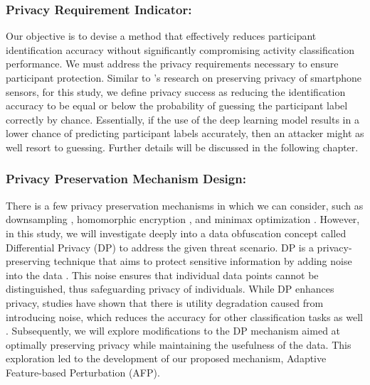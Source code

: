 \documentclass{l4proj}
\begin{document}
\subsubsection{Privacy Requirement Indicator:}
Our objective is to devise a method that effectively reduces participant identification accuracy without significantly compromising activity classification performance. We must address the privacy requirements necessary to ensure participant protection. Similar to \cite{differential_privacy_with_weighted_privacy_preservation}'s research on preserving privacy of smartphone sensors, for this study, we define privacy success as reducing the identification accuracy to be equal or below the probability of guessing the participant label correctly by chance. Essentially, if the use of the deep learning model results in a lower chance of predicting participant labels accurately, then an attacker might as well resort to guessing. Further details will be discussed in the following chapter.

\subsubsection{Privacy Preservation Mechanism Design:}
There is a few privacy preservation mechanisms in which we can consider, such as downsampling \citep{privacy-preservation_using_low_resolution_depth_images, privacy_preserving_for_extreme_low_resolution}, homomorphic encryption \citep{crypto-nets_neural_network_over_encrypted_data}, and minimax optimization \citep{privacy_preserving_adversarial_framework}. However, in this study, we will investigate deeply into a data obfuscation concept called Differential Privacy (DP) to address the given threat scenario. DP is a privacy-preserving technique that aims to protect sensitive information by adding noise into the data \citep{differential_privacy}. This noise ensures that individual data points cannot be distinguished, thus safeguarding privacy of individuals. While DP enhances privacy, studies have shown that there is utility degradation caused from introducing noise, which reduces the accuracy for other classification tasks as well \citep{algorithmic_foundations_of_differential_privacy, limits_of_differential_privacy_and_its_misuse, tradeoff_between_dp_and_utility}. Subsequently, we will explore modifications to the DP mechanism aimed at optimally preserving privacy while maintaining the usefulness of the data. This exploration led to the development of our proposed mechanism, Adaptive Feature-based Perturbation (AFP).
\end{document}
